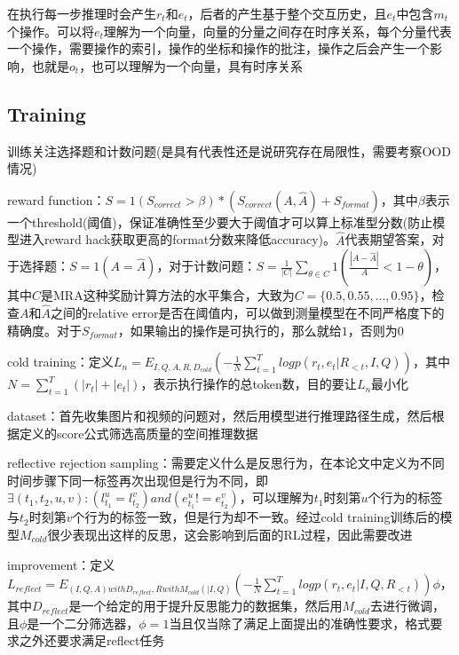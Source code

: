 \documentclass[a4paper,12pt]{article}
\begin{document}
在执行每一步推理时会产生$r_t$和$e_t$，后者的产生基于整个交互历史，且$e_t$中包含$m_t$个操作。可以将$e_t$理解为一个向量，向量的分量之间存在时序关系，每个分量代表一个操作，需要操作的索引，操作的坐标和操作的批注，操作之后会产生一个影响，也就是$o_t$，也可以理解为一个向量，具有时序关系

\subsection{Training}
训练关注选择题和计数问题(是具有代表性还是说研究存在局限性，需要考察OOD情况)

reward function：$S = 1(S_{correct} > \beta) * (S_{correct}(A, \hat{A}) + S_{format})$，其中$\beta$表示一个threshold(阈值)，保证准确性至少要大于阈值才可以算上标准型分数(防止模型进入reward hack获取更高的format分数来降低accuracy)。$\hat{A}$代表期望答案，对于选择题：$S = 1(A = \hat{A})$，对于计数问题：$S = \frac{1}{|C|}\sum_{\theta \in C}1(\frac{|A - \hat{A}|}{A} < 1-\theta)$，其中$C$是MRA这种奖励计算方法的水平集合，大致为$C = \{0.5, 0.55, \dots, 0.95\}$，检查$A$和$\hat{A}$之间的relative error是否在阈值内，可以做到测量模型在不同严格度下的精确度。对于$S_{format}$，如果输出的操作是可执行的，那么就给$1$，否则为$0$

cold training：定义$L_n = E_{I, Q, A, R, D_{cold}}(-\frac{1}{N}\sum_{t=1}^{T}logp(r_t, e_t|R_{<t}, I, Q))$，其中$N = \sum_{t=1}^{T}(|r_t| + |e_t|)$，表示执行操作的总token数，目的要让$L_n$最小化

dataset：首先收集图片和视频的问题对，然后用模型进行推理路径生成，然后根据定义的score公式筛选高质量的空间推理数据

reflective rejection sampling：需要定义什么是反思行为，在本论文中定义为不同时间步骤下同一标签再次出现但是行为不同，即$\exists(t_1, t_2, u, v): (l_{t_1}^{u} = l_{t_2}^{v}) and (e_{t_1}^u != e_{t_2}^{v})$，可以理解为$t_1$时刻第$u$个行为的标签与$t_2$时刻第$v$个行为的标签一致，但是行为却不一致。经过cold training训练后的模型$M_{cold}$很少表现出这样的反思，这会影响到后面的RL过程，因此需要改进

improvement：定义\(L_{reflect} = E_{(I, Q, A) with D_{reflect}, R with M_{cold}(|I, Q)}(-\frac{1}{N}\sum_{t=1}^{T}log p(r_t, e_t | I, Q, R_{<t}))\phi\)，其中$D_{reflect}$是一个给定的用于提升反思能力的数据集，然后用$M_{cold}$去进行微调，且$\phi$是一个二分筛选器，$\phi=1$当且仅当除了满足上面提出的准确性要求，格式要求之外还要求满足reflect任务
\end{document}
